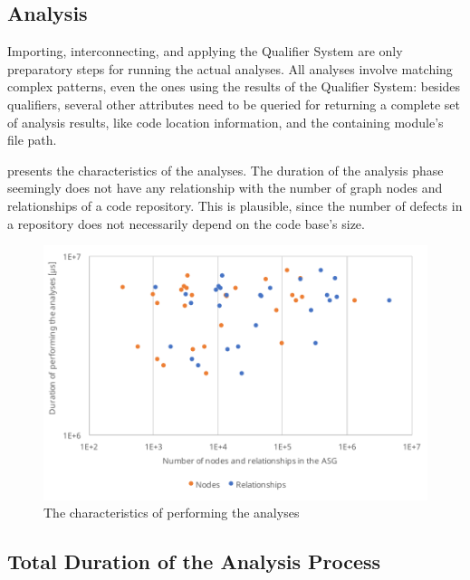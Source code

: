\subsection{Analysis}

Importing, interconnecting, and applying the Qualifier System are only preparatory steps for running the actual analyses. All analyses involve matching complex patterns, even the ones using the results of the Qualifier System: besides qualifiers, several other attributes need to be queried for returning a complete set of analysis results, like code location information, and the containing module's file path.

 presents the characteristics of the analyses. The duration of the analysis phase seemingly does not have any relationship with the number of graph nodes and relationships of a code repository. This is plausible, since the number of defects in a repository does not necessarily depend on the code base's size.

\vspace*{-2mm}
\begin{figure}[!htb]
	\centerfloat
	\includegraphics[width=\textwidth,clip]{figures/measurement-analysis-nodes-relationships.pdf}
	\caption{The characteristics of performing the analyses}
	\label{fig:measurement-analysis-nodes-relationships}
\end{figure}
\vspace*{-2mm}

\subsection{Total Duration of the Analysis Process}

